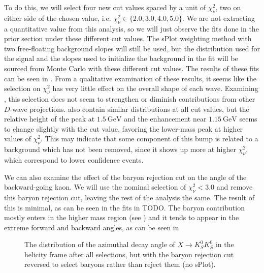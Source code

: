 To do this, we will select four new cut values spaced by a unit of $\chi^2_\nu$, two on either side of the chosen value, i.e. $\chi^2_\nu \in \{2.0, 3.0, 4.0, 5.0\}$. We are not extracting a quantitative value from this analysis, so we will just observe the fits done in the prior section under these different cut values. The sPlot weighting method with two free-floating background slopes will still be used, but the distribution used for the signal and the slopes used to initialize the background in the fit will be sourced from Monte Carlo with these different cut values. The results of these fits can be seen in . From a qualitative examination of these results, it seems like the selection on $\chi^2_\nu$ has very little effect on the overall shape of each wave. Examining , this selection does not seem to strengthen or diminish contributions from other $D$-wave projections.  also contain similar distributions at all cut values, but the relative height of the peak at $\SI{1.5}{\giga\electronvolt}$ and the enhancement near $\SI{1.15}{\giga\electronvolt}$ seems to change slightly with the cut value, favoring the lower-mass peak at higher values of $\chi^2_\nu$. This may indicate that some component of this bump is related to a background which has not been removed, since it shows up more at higher $\chi^2_\nu$, which correspond to lower confidence events.


We can also examine the effect of the baryon rejection cut on the angle of the backward-going kaon. We will use the nominal selection of $\chi^2_\nu < 3.0$ and remove this baryon rejection cut, leaving the rest of the analysis the same. The result of this is minimal, as can be seen in the fits in {\color{red} TODO}. The baryon contribution mostly enters in the higher mass region (see ) and it tends to appear in the extreme forward and backward angles, as can be seen in 

\begin{figure}
  \begin{center}
    
  \end{center}
  \caption{The distribution of the azimuthal decay angle of $X \to K_S^0K_S^0$ in the helicity frame after all selections, but with the baryon rejection cut reversed to select baryons rather than reject them (no sPlot).}\label{fig:costheta-hx-v-meson-mass-data-pz-masscut-baryons}
\end{figure}


